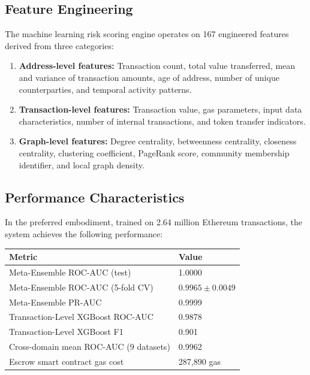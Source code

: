 \documentclass[12pt,a4paper]{article}
\begin{document}
\subsection{Feature Engineering}

The machine learning risk scoring engine operates on 167 engineered features 
derived from three categories:

\begin{enumerate}[label=(\alph*)]
\item \textbf{Address-level features:} Transaction count, total value 
transferred, mean and variance of transaction amounts, age of address, 
number of unique counterparties, and temporal activity patterns.

\item \textbf{Transaction-level features:} Transaction value, gas 
parameters, input data characteristics, number of internal transactions, 
and token transfer indicators.

\item \textbf{Graph-level features:} Degree centrality, betweenness 
centrality, closeness centrality, clustering coefficient, PageRank score, 
community membership identifier, and local graph density.
\end{enumerate}

\subsection{Performance Characteristics}

In the preferred embodiment, trained on 2.64 million Ethereum transactions, 
the system achieves the following performance:

\begin{center}
\begin{tabular}{ll}
\toprule
\textbf{Metric} & \textbf{Value} \\
\midrule
Meta-Ensemble ROC-AUC (test) & 1.0000 \\
Meta-Ensemble ROC-AUC (5-fold CV) & $0.9965 \pm 0.0049$ \\
Meta-Ensemble PR-AUC & 0.9999 \\
Transaction-Level XGBoost ROC-AUC & 0.9878 \\
Transaction-Level XGBoost F1 & 0.901 \\
Cross-domain mean ROC-AUC (9 datasets) & 0.9962 \\
Escrow smart contract gas cost & 287,890 gas \\
\bottomrule
\end{tabular}
\end{center}
\end{document}
